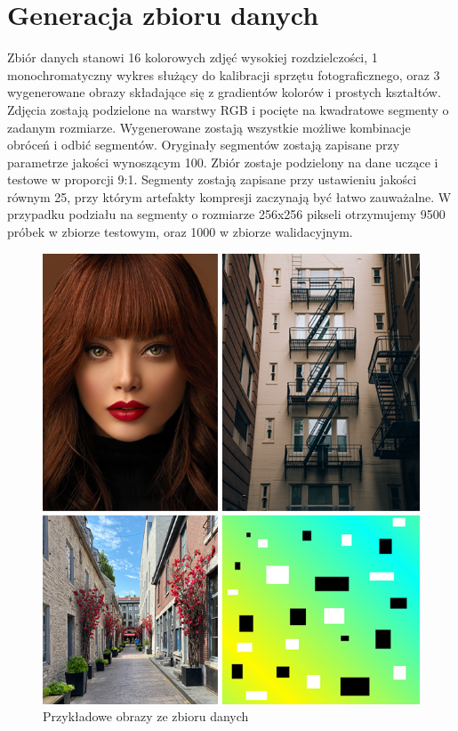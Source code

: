 \documentclass[a4paper, 12pt]{article}
\begin{document}
\section{Generacja zbioru danych}
Zbiór danych stanowi 16 kolorowych zdjęć wysokiej rozdzielczości, 1 monochromatyczny wykres służący do kalibracji sprzętu fotograficznego,
oraz 3 wygenerowane obrazy składające się z gradientów kolorów i prostych kształtów.
Zdjęcia zostają podzielone na warstwy RGB i pocięte na kwadratowe segmenty o zadanym rozmiarze.
Wygenerowane zostają wszystkie możliwe kombinacje obróceń i odbić segmentów.
Oryginały segmentów zostają zapisane przy parametrze jakości wynoszącym 100.
Zbiór zostaje podzielony na dane uczące i testowe w proporcji 9:1.
Segmenty zostają zapisane przy ustawieniu jakości równym 25, przy którym artefakty kompresji zaczynają być łatwo zauważalne.
W przypadku podziału na segmenty o rozmiarze 256x256 pikseli otrzymujemy 9500 próbek w zbiorze testowym, oraz 1000 w zbiorze walidacyjnym.
\begin{figure}[h!]
\begin{center}
	\includegraphics[width=0.85\columnwidth]{dataset.png}
	\caption{Przykładowe obrazy ze zbioru danych}
\end{center}
\end{figure}

\newpage
\end{document}

